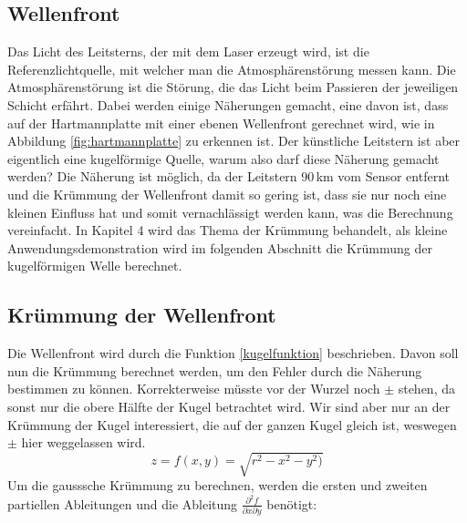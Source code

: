 \begin{refsection}
\section{Wellenfront}
Das Licht des Leitsterns, der mit dem Laser erzeugt wird, ist die
%
Referenzlichtquelle, mit welcher man die Atmosphärenstörung messen
kann. Die Atmosphärenstörung ist die Störung, die das Licht beim
Passieren der jeweiligen Schicht erfährt. Dabei werden einige Näherungen
gemacht, eine davon ist, dass auf der Hartmannplatte mit einer ebenen
Wellenfront gerechnet wird, wie in Abbildung \ref{fig:hartmannplatte}
zu erkennen ist. Der künstliche Leitstern ist aber eigentlich eine
kugelförmige Quelle, warum also darf diese Näherung gemacht werden? Die
Näherung ist möglich, da der Leitstern 90\,km vom Sensor entfernt
und die Krümmung der Wellenfront damit so gering ist, dass sie nur
noch eine kleinen Einfluss hat und somit vernachlässigt werden kann,
was die Berechnung vereinfacht. In Kapitel 4 wird das Thema der Krümmung
behandelt, als kleine Anwendungsdemonstration wird im folgenden Abschnitt
die Krümmung der kugelförmigen Welle berechnet.

\subsection{Krümmung der Wellenfront}
Die Wellenfront wird durch die Funktion \eqref{kugelfunktion}
beschrieben. Davon soll nun die Krümmung berechnet werden, um den
Fehler durch die Näherung bestimmen zu können. Korrekterweise müsste
vor der Wurzel noch $\pm$ stehen, da sonst nur die obere Hälfte der
Kugel betrachtet wird. Wir sind aber nur an der Krümmung der Kugel
interessiert, die auf der ganzen Kugel gleich ist, weswegen  $\pm$
hier weggelassen wird.
\begin{equation}\label{kugelfunktion}
z=f(x,y)=\sqrt{r^{2}-x^{2}-y^{2})}
\end{equation}
Um die gausssche Krümmung zu berechnen, werden die ersten und zweiten
partiellen Ableitungen und die Ableitung $ \frac{\partial^2 f}{\partial
x \partial y}$ benötigt:


\end{refsection}
